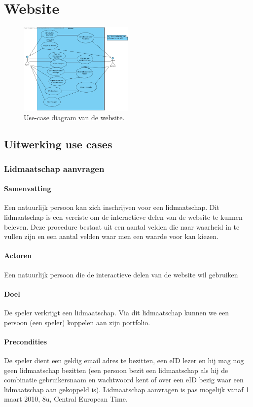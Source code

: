 \section{Website}

\begin{figure}[h!]
	\centering
		\includegraphics[width=0.5\textwidth]{images/analyse/ucd_website}
	\caption{Use-case diagram van de website.}
\end{figure}

\subsection{Uitwerking use cases}

\subsubsection{Lidmaatschap aanvragen}
\paragraph{Samenvatting}Een natuurlijk persoon kan zich inschrijven voor een lidmaatschap. Dit lidmaatschap is een vereiste om de interactieve delen van de website te kunnen beleven. Deze procedure bestaat uit een aantal velden die naar waarheid in te vullen zijn en een aantal velden waar men een waarde voor kan kiezen.
\paragraph{Actoren}Een natuurlijk persoon die de interactieve delen van de website wil gebruiken
\paragraph{Doel}De speler verkrijgt een lidmaatschap. Via dit lidmaatschap kunnen we een persoon (een speler) koppelen aan zijn portfolio.
\paragraph{Precondities}De speler dient een geldig email adres te bezitten, een eID lezer en hij mag nog geen lidmaatschap bezitten (een persoon bezit een lidmaatschap als hij de combinatie gebruikersnaam en wachtwoord kent of over een eID bezig waar een lidmaatschap aan gekoppeld is). \small{Lidmaatschap aanvragen is pas mogelijk vanaf 1 maart 2010, 8u, Central European Time.}
